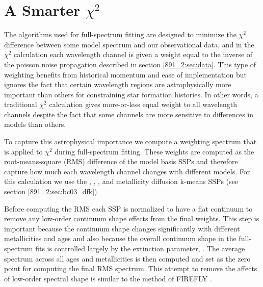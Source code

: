 \section{A Smarter $\chi^2$}
\label{891_2:sec:smart_chi}

The algorithms used for full-spectrum fitting are designed to minimize
the $\chi^2$ difference between some model spectrum and our
observational data, and in the $\chi^2$ calculation each wavelength
channel is given a weight equal to the inverse of the poisson noise
propagation described in section \ref{891_2:sec:data}. This type of
weighting benefits from historical momentum and ease of implementation
but ignores the fact that certain wavelength regions are
astrophysically more important than others for constraining star
formation histories. In other words, a traditional $\chi^2$
calculation gives more-or-less equal weight to all wavelength channels
despite the fact that some channels are more sensitive to differences
in models than others.



To capture this astrophysical importance we compute a weighting
spectrum that is applied to $\chi^2$ during full-spectrum
fitting. These weights are computed as the root-means-square (RMS)
difference of the model basis SSPs and therefore capture how much each
wavelength channel changes with different models. For this calculation
we use the , , , and
 metallicity  diffusion k-means
SSPs (see section \ref{891_2:sec:bc03_dfk}).


Before computing the RMS each SSP is normalized to have a flat
continuum to remove any low-order continuum shape effects from the
final weights. This step is important because the continuum shape
changes significantly with different metallicities and ages and also
because the overall continuum shape in the full-spectrum fits is
controlled largely by the extinction parameter, \tauV. The average
spectrum across all ages and metallicities is then computed and set as
the zero point for computing the final RMS spectrum. This attempt to
remove the affects of low-order spectral shape is similar to the
method of FIREFLY \citep{Wilkinson15}.


